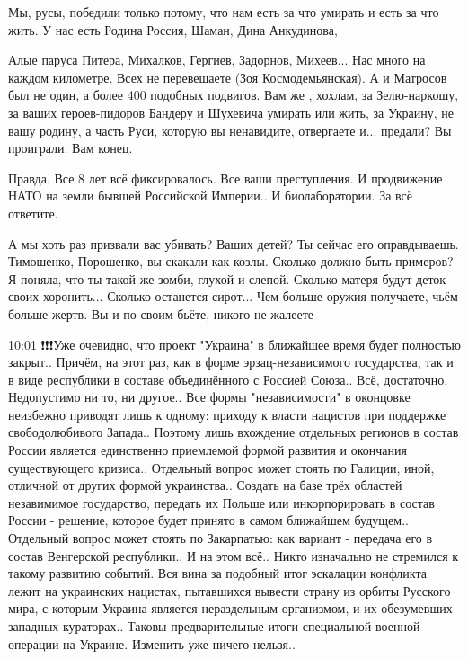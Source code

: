 Мы, русы, победили только потому, что нам есть за что умирать и есть за что
жить. У нас есть Родина Россия, Шаман, Дина Анкудинова,

Алые паруса Питера, Михалков, Гергиев, Задорнов, Михеев... Нас много на каждом
километре. Всех не перевешаете (Зоя Космодемьянская). А и Матросов был не один,
а более 400 подобных подвигов. Вам же , хохлам, за Зелю-наркошу, за ваших
героев-пидоров Бандеру и Шухевича умирать или жить, за Украину, не вашу родину,
а часть Руси, которую вы ненавидите, отвергаете и... предали? Вы проиграли. Вам
конец.

Правда.
Все 8 лет всё  фиксировалось.
Все ваши преступления. 
И продвижение НАТО  на земли бывшей  Российской  Империи.. 
И биолаборатории. 
За всё  ответите.

А мы хоть раз призвали вас убивать? Ваших детей? Ты сейчас его оправдываешь.
Тимошенко, Порошенко, вы скакали как козлы. Сколько должно быть примеров? Я поняла, что ты такой же зомби, глухой и слепой.
Сколько матеря будут деток своих хоронить... Сколько останется сирот... Чем больше оружия получаете, чьём больше жертв. Вы и по своим бьёте, никого не жалеете

10:01
❗️❗️❗️Уже очевидно, что проект "Украина" в ближайшее время будет полностью закрыт..
Причём, на этот раз, как в форме эрзац-независимого государства, так и в виде республики в составе объединённого с Россией Союза..
Всё, достаточно. Недопустимо ни то, ни другое.. Все формы "независимости" в оконцовке неизбежно приводят лишь к одному: приходу к власти нацистов при поддержке свободолюбивого Запада..
Поэтому лишь вхождение отдельных регионов в состав России является единственно приемлемой формой развития и окончания существующего кризиса..
Отдельный вопрос может стоять по Галиции, иной, отличной от других формой украинства.. Создать на базе трёх областей незавимимое государство, передать их Польше или инкорпорировать в состав России - решение, которое будет принято в самом ближайшем будущем..
Отдельный вопрос может стоять по Закарпатью: как вариант - передача его в состав Венгерской республики..
И на этом всё..
Никто изначально не стремился к такому развитию событий. Вся вина за подобный итог эскалации конфликта лежит на украинских нацистах, пытавшихся вывести страну из орбиты Русского мира, с которым Украина является нераздельным организмом, и их обезумевших западных кураторах..
Таковы предварительные итоги специальной военной операции на Украине. Изменить уже ничего нельзя..


